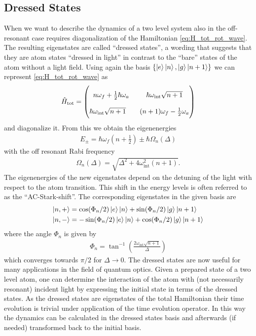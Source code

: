 \subsection{Dressed States}
\label{sec:DressedStates}
When we want to describe the dynamics of a two level system also in the
off-resonant case requires diagonalization of the Hamiltonian
\eqref{eq:H_tot_rot_wave}. The resulting eigenstates are called ``dressed
states'', a wording that suggests that they are atom states ``dressed in light'' in contrast
to the ``bare'' states of the atom without a light field. Using again the basis
$\left\lbrace \ket{e}\ket{n}, \ket{g}\ket{n+1}\right\rbrace$ we can represent
\eqref{eq:H_tot_rot_wave} as
\begin{align}
  \label{eq:H_tot_matrix}
  \hat{H}_{\text{tot}} = 
  \renewcommand*{\arraystretch}{2}
  \begin{pmatrix*}[c]
    n\omega_f + \frac{1}{2} \hbar\omega_a & \hbar\omega_{\text{int}} \sqrt{n+1}\\
    \hbar\omega_{\text{int}} \sqrt{n+1}\quad & (n+1)\omega_f - \frac{1}{2}\omega_a
  \end{pmatrix*}
\end{align}
and diagonalize it. From this we obtain the eigenenergies 
\begin{align}
  \label{eq:eigenergies}
  E_\pm = \hbar\omega_f\left(n+\frac{1}{2}\right) \pm \hbar\Omega_n(\Delta)
\end{align}
with the off resonant Rabi frequency
\begin{align}
  \label{eq:Omega_n}
  \Omega_n(\Delta) = \sqrt{\Delta^2 + 4 \omega_{\text{int}}^2(n+1)}.
\end{align}
The eigenenergies of the new eigenstates depend on the detuning of the light
with respect to the atom transition. This shift in the energy levels is often
referred to as the ``AC-Stark-shift''.
The corresponding eigenstates in the given basis are
\begin{align}
  \label{eq:eigenstates}
  \ket{n,+} &=  \cos(\Phi_n/2)\ket{e}\ket{n} +  \sin(\Phi_n/2) \ket{g}\ket{n+1}\\ 
  \ket{n,-} &=  -\sin(\Phi_n/2)\ket{e}\ket{n} +  \cos(\Phi_n/2) \ket{g}\ket{n+1} 
\end{align}
where the angle $\Phi_n$ is given by
\begin{align}
  \label{eq:phi_n}
  \Phi_n = \tan^{-1}\left( \frac{2\omega_{\text{int}}\sqrt{n+1}}{\Delta} \right)
\end{align}
which converges towards $\pi/2$ for $\Delta\rightarrow 0$. The dressed states
are now useful for many applications in the field of quantum optics. Given a
prepared state of a two level atom, one can determine the interaction of the
atom with (not necessarily resonant) incident light by expressing the initial
state in terms of the dressed states. As the dressed states are eigenstates of
the total Hamiltonian their time evolution is trivial under application of the
time evolution operator. In this way the dynamics can be calculated in the
dressed states basis and afterwards (if needed) transformed back to the initial
basis.

